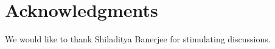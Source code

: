 \documentclass[10pt,letterpaper]{article}
\begin{document}
\section*{Acknowledgments}
We would like to thank Shiladitya Banerjee for stimulating discussions.

\nolinenumbers

% 


\end{document}
